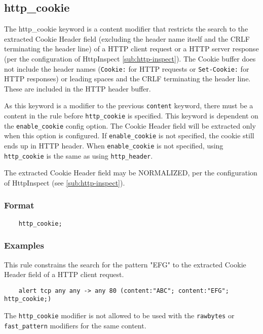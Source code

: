 \documentclass[english]{report}
\newenvironment{note}{
\samepage
    \vspace{10pt}{\textsf{
        {\hspace{7pt}\Huge{$\triangle$\hspace{-12.5pt}{\Large{$^!$}}}}\hspace{5pt}
        {\Large{NOTE}}
    }
    }
   \begin{center}
    \par\vspace{-17pt}

    \begin{lrbox}{\savepar}
    \begin{minipage}[r]{6in}
}
{
    \end{minipage}
    \end{lrbox}
    \fbox{
        \usebox{
            \savepar
	}
    }
    \par\vskip10pt
    \end{center}
}
\newenvironment{note}{
        \begin{rawhtml}
        <p><table border="1"><tr><td><b>
        Note:&nbsp;&nbsp;</b>
        \end{rawhtml}
}{
        \begin{rawhtml}
        </b></td></tr></table></p>
        \end{rawhtml}
}
\begin{document}
\subsection{http\_cookie}
\label{sub:HttpCookie}

The http\_cookie keyword is a content modifier that restricts the search to the
extracted Cookie Header field (excluding the header name itself and the CRLF terminating 
the header line) of a HTTP client request or a HTTP server response (per the configuration 
of HttpInspect \ref{sub:http-inspect}). The Cookie buffer does not include the header 
names (\texttt{Cookie:} for HTTP requests or \texttt{Set-Cookie:} for HTTP responses) 
or leading spaces and the CRLF terminating the header line. These are included in the HTTP
header buffer. 

As this keyword is a modifier to the previous \texttt{content} keyword, there must be
a content in the rule before \texttt{http\_cookie} is specified. This keyword is dependent
on the \texttt{enable\_cookie} config option. The Cookie Header field will be extracted only
when this option is configured. If \texttt{enable\_cookie} is not specified, the cookie 
still ends up in HTTP header.  When \texttt{enable\_cookie} is not specified, using 
\texttt{http\_cookie} is the same as using \texttt{http\_header}.

The extracted Cookie Header field may be NORMALIZED, per the configuration of
HttpInspect (see \ref{sub:http-inspect}).

\subsubsection{Format}

\begin{verbatim}
    http_cookie;
\end{verbatim}

\subsubsection{Examples}

This rule constrains the search for the pattern "EFG" to the extracted Cookie
Header field of a HTTP client request.

\begin{verbatim}
    alert tcp any any -> any 80 (content:"ABC"; content:"EFG"; http_cookie;)
\end{verbatim}

\begin{note}

The \texttt{http\_cookie} modifier is not allowed to be used with the
\texttt{rawbytes} or \texttt{fast\_pattern} modifiers for the same content.

\end{note}
\end{document}
